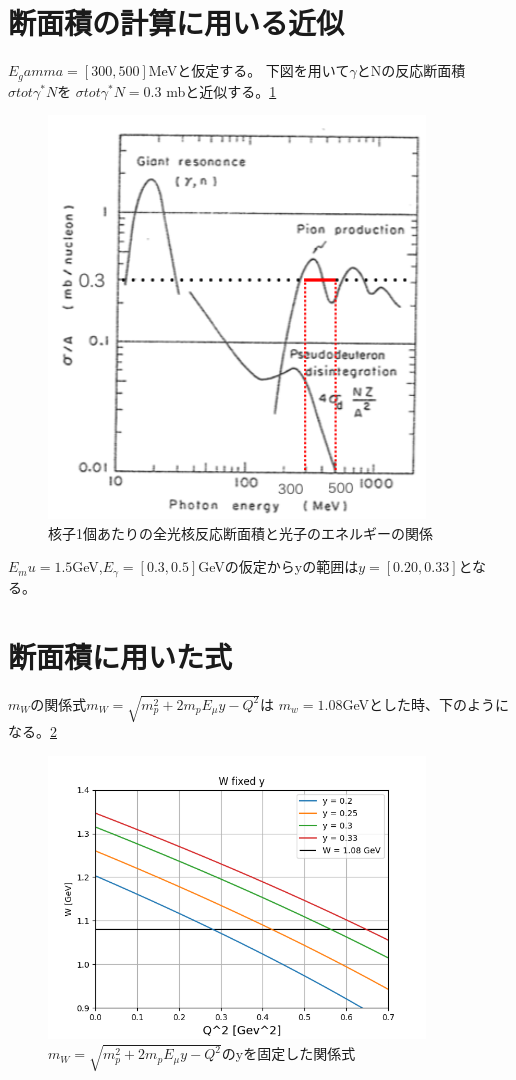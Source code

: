 \section{断面積の計算に用いる近似}
$E_gamma = [300, 500]$MeVと仮定する。
下図を用いて$\gamma$とNの反応断面積$\sigma{tot}\gamma^* N$を
$\sigma{tot}\gamma^* N = 0.3$ mbと近似する。\ref*{fig:test5}
\begin{figure}[H]
    \centering
    \includegraphics[width=10cm]{img/sigma_tot.png}
    \caption{核子1個あたりの全光核反応断面積と光子のエネルギーの関係}
    \label{fig:test5}
\end{figure}

$E_mu = 1.5$GeV,$E_\gamma = [0.3, 0.5]$GeVの仮定からyの範囲は$y = [0.20, 0.33]$となる。


\section{断面積に用いた式}
$m_W$の関係式$m_W = \sqrt{m_p^2 + 2m_pE_\mu y - Q^2}$は
$m_w = 1.08$GeVとした時、下のようになる。\ref{fig:test6}

\begin{figure}[H]
    \centering
    \includegraphics[width=10cm]{img/W2_fixed_y.png}
    \caption{$m_W = \sqrt{m_p^2 + 2m_pE_\mu y - Q^2}$のyを固定した関係式}
    \label{fig:test6}
\end{figure}

